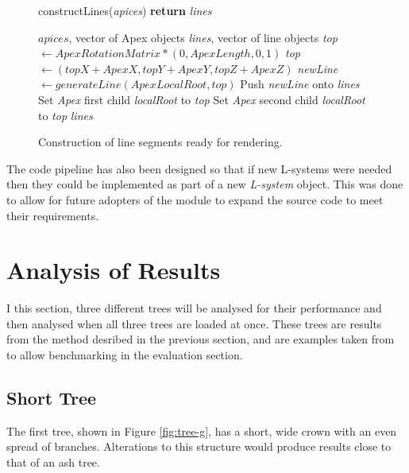\documentclass[final]{cmpreport}
\begin{document}
\begin{figure}[ht]
    \begin{algorithm}[H]
    \caption{constructLines(\emph{apices}) {\textbf{return}} \emph{lines}}
        \begin{algorithmic}[1]
        \Require $apices$, vector of Apex objects
        \Ensure \emph{lines}, vector of line objects
            \State \emph{top} $\leftarrow ApexRotationMatrix * (0, ApexLength, 0, 1)$ 
            \State \emph{top} $\leftarrow (topX + ApexX, topY + ApexY, topZ + ApexZ)$ 
            \State \emph{newLine} $\leftarrow generateLine(ApexLocalRoot, top)$ 
            \State Push \emph{newLine} onto \emph{lines}
                \State Set \emph{Apex} first child \emph{localRoot} to \emph{top}
            \EndIf
                \State Set \emph{Apex} second child \emph{localRoot} to \emph{top}
            \EndIf
        \EndFor
        \State \Return \emph{lines}
        \end{algorithmic}
    \end{algorithm}
    \caption{Construction of line segments ready for rendering.}
    \label{fig:construct-lines}
\end{figure}

The code pipeline has also been designed so that if new L-systems were needed then they could 
be implemented as part of a new \emph{L-system} object. This was done to allow for future 
adopters of the module to expand the source code to meet their requirements.

\section{Analysis of Results}
I this section, three different trees will be analysed for their performance and then analysed 
when all three trees are loaded at once. These trees are results from the method desribed in 
the previous section, and are examples taken from \cite{prusinkiewicz1996systems} to allow 
benchmarking in the evaluation section.

\subsection{Short Tree}
The first tree, shown in Figure \ref{fig:tree-g}, has a short, wide crown with an even spread of branches.
Alterations to this structure would produce results close to that of an ash tree. 
\end{document}
